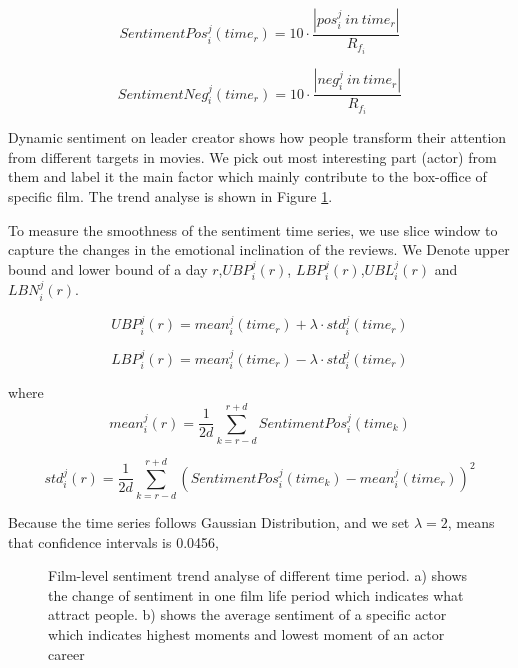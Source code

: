 \begin{equation}
    SentimentPos^j_i (time_r) = 10\cdot \frac{|pos^j_i \ in \ time_r|}{R_{f_i}}
\end{equation}

\begin{equation}
    SentimentNeg^j_i (time_r) = 10\cdot \frac{|neg^j_i \ in \ time_r|}{R_{f_i}}
\end{equation}

\par Dynamic sentiment on leader creator shows how people transform their attention from different targets in movies. We pick out most interesting part (actor) from them and label it the main factor which mainly contribute to the box-office of specific film. The trend analyse is shown in Figure \ref{fig:sentiment}.

\par To measure the smoothness of the sentiment time series, we use slice window to capture the changes in the emotional inclination of the reviews. We Denote upper bound and lower bound of a day $r$,$UBP^j_i (r)$, $LBP^j_i (r)$,$UBL^j_i (r)$ and $LBN^j_i (r)$.

\begin{equation}
    UBP^j_i (r) = mean^j_i (time_r)+\lambda \cdot std^j_i (time_r)
\end{equation}

\begin{equation}
    LBP^j_i (r) = mean^j_i (time_r)-\lambda \cdot std^j_i (time_r)
\end{equation}

where
\begin{equation}
    mean^j_i (r) = \frac{1}{2d}\sum_{k=r-d}^{r+d}SentimentPos^j_i (time_k)
\end{equation}

\begin{equation}
    std^j_i (r) = \frac{1}{2d}\sum_{k=r-d}^{r+d}(SentimentPos^j_i (time_k)- mean^j_i (time_r))^2
\end{equation}

\par Because the time series follows Gaussian Distribution, and we set $\lambda=2$, means that confidence intervals is 0.0456,

\begin{figure}[!htbp]
\centering
{}
\hfill
{}
\caption{Film-level sentiment trend analyse of different time period. a) shows the change of sentiment in one film life period which indicates what attract people. b) shows the average sentiment of a specific actor which indicates highest moments and lowest moment of an actor career }
\label{fig:sentiment}
\end{figure}


